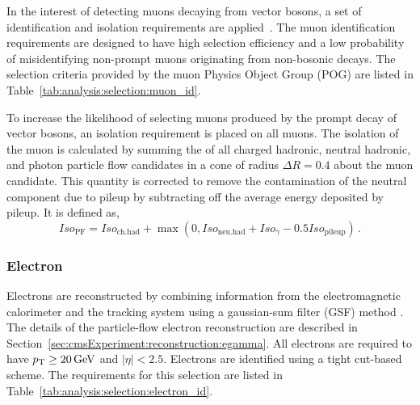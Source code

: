 In the interest of detecting muons decaying from vector bosons, a set of identification and isolation requirements are applied~\cite{Sirunyan:2018fpa}. The muon identification requirements are designed to have high selection efficiency and a low probability of misidentifying non-prompt muons originating from non-bosonic decays. The selection criteria provided by the muon Physics Object Group (POG) are listed in Table~\ref{tab:analysis:selection:muon_id}.



\noindent To increase the likelihood of selecting muons produced by the prompt decay of vector bosons, an isolation requirement is placed on all muons. The isolation of the muon is calculated by summing the \pt of all charged hadronic, neutral hadronic, and photon particle flow candidates in a cone of radius $\Delta R = 0.4$ about the muon candidate. This quantity is corrected to remove the contamination of the neutral component due to pileup by subtracting off the average energy deposited by pileup. It is defined as,
\begin{equation*} 
    Iso_\mathrm{PF} = Iso_\mathrm{ ch. had} + \max\left(0, Iso_\mathrm{ neu. had} + Iso_{\gamma} - 0.5 Iso_\mathrm{ pileup}\right)\,.
\end{equation*}








\subsubsection{Electron}

Electrons are reconstructed by combining information from the electromagnetic calorimeter and the tracking system using a gaussian-sum filter (GSF) method \cite{Baffioni:2006cd}. The details of the particle-flow electron reconstruction are described in Section~\ref{sec:cmsExperiment:reconstruction:egamma}. All electrons are required to have $p_{\mathrm{T}} \geq 20 \,\text{Ge\hspace{-.08em}V}$ and $|\eta| < 2.5$.  Electrons are identified using a tight cut-based scheme. The requirements for this selection are listed in Table~\ref{tab:analysis:selection:electron_id}.



